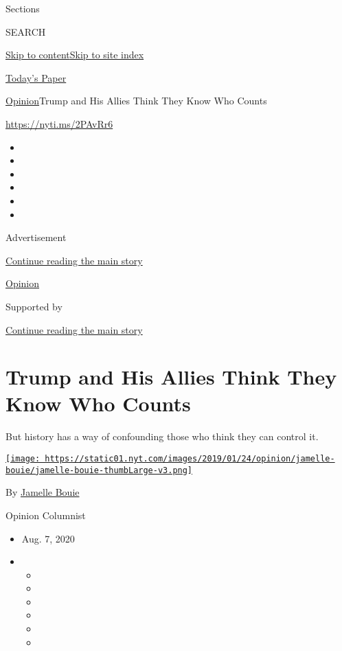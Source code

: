 Sections

SEARCH

\protect\hyperlink{site-content}{Skip to
content}\protect\hyperlink{site-index}{Skip to site index}

\href{https://myaccount.nytimes.com/auth/login?response_type=cookie\&client_id=vi}{}

\href{https://www.nytimes.com/section/todayspaper}{Today's Paper}

\href{/section/opinion}{Opinion}\textbar{}Trump and His Allies Think
They Know Who Counts

\href{https://nyti.ms/2PAvRr6}{https://nyti.ms/2PAvRr6}

\begin{itemize}
\item
\item
\item
\item
\item
\item
\end{itemize}

Advertisement

\protect\hyperlink{after-top}{Continue reading the main story}

\href{/section/opinion}{Opinion}

Supported by

\protect\hyperlink{after-sponsor}{Continue reading the main story}

\hypertarget{trump-and-his-allies-think-they-know-who-counts}{%
\section{Trump and His Allies Think They Know Who
Counts}\label{trump-and-his-allies-think-they-know-who-counts}}

But history has a way of confounding those who think they can control
it.

\href{https://www.nytimes.com/column/jamelle-bouie}{\texttt{[image: https://static01.nyt.com/images/2019/01/24/opinion/jamelle-bouie/jamelle-bouie-thumbLarge-v3.png]}}

By \href{https://www.nytimes.com/column/jamelle-bouie}{Jamelle Bouie}

Opinion Columnist

\begin{itemize}
\item
  Aug. 7, 2020
\item
  \begin{itemize}
  \item
  \item
  \item
  \item
  \item
  \item
  \end{itemize}
\end{itemize}


